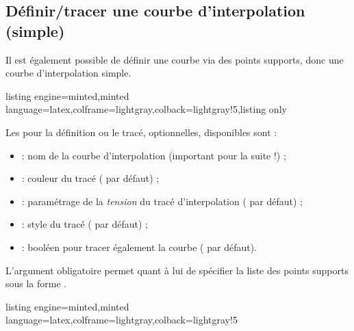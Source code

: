 \documentclass[11pt,a4paper]{ltxdoc}
\begin{document}
\pagebreak

\subsection{Définir/tracer une courbe d'interpolation (simple)}\label{deftracinterpo}

Il est également possible de définir une courbe via des points supports, donc une courbe d'interpolation simple.

\begin{tcblisting}{listing engine=minted,minted language=latex,colframe=lightgray,colback=lightgray!5,listing only}
\end{tcblisting}

Les \MontreCode{[clés]} pour la définition ou le tracé, optionnelles, disponibles sont :

\smallskip

\begin{itemize}
	\item {} : nom de la courbe d'interpolation (important pour la suite !) ;
	\item {} : couleur du tracé ( par défaut) ;
	\item {} : paramétrage de la \textit{tension} du tracé d'interpolation ( par défaut) ;
	\item {} : style du tracé ( par défaut) ;
	\item {} : booléen pour tracer également la courbe ( par défaut).
\end{itemize}

L'argument obligatoire permet quant à lui de spécifier la liste des points supports sous la forme .

\begin{tcblisting}{listing engine=minted,minted language=latex,colframe=lightgray,colback=lightgray!5}
\begin{GraphiqueTikz}%
	[x=0.8cm,y=1cm,Xmin=-7,Xmax=4,Ymin=-3,Ymax=5]
\end{GraphiqueTikz}
\end{tcblisting}
\end{document}
